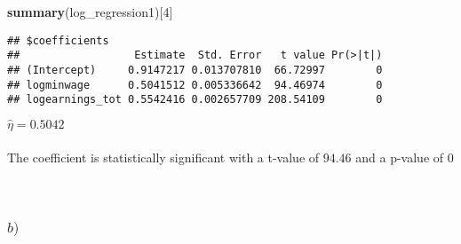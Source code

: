 \documentclass[
]{article}
\newenvironment{Shaded}{\begin{snugshade}}{\end{snugshade}}
\newcommand{\DecValTok}[1]{\textcolor[rgb]{0.00,0.00,0.81}{#1}}
\newcommand{\KeywordTok}[1]{\textcolor[rgb]{0.13,0.29,0.53}{\textbf{#1}}}
\newcommand{\NormalTok}[1]{#1}
\begin{document}
\begin{Shaded}
\begin{Highlighting}[]
\KeywordTok{summary}\NormalTok{(log\_regression1)[}\DecValTok{4}\NormalTok{]}
\end{Highlighting}
\end{Shaded}

\begin{verbatim}
## $coefficients
##                  Estimate  Std. Error   t value Pr(>|t|)
## (Intercept)     0.9147217 0.013707810  66.72997        0
## logminwage      0.5041512 0.005336642  94.46974        0
## logearnings_tot 0.5542416 0.002657709 208.54109        0
\end{verbatim}

\hfill\break
\(\hat{\eta} = 0.5042\)\\
~\\
The coefficient is statistically significant with a t-value of \(94.46\)
and a p-value of \(0\)\\
~\\
~\\

\hypertarget{b-1}{%
\subsubsection{\texorpdfstring{\(b)\)}{b)}}\label{b-1}}

\hfill\break
\end{document}
